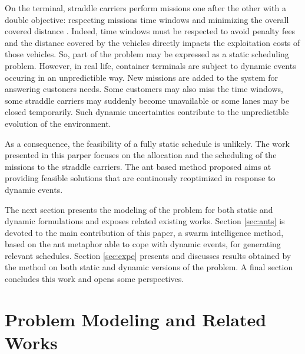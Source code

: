 \documentclass[a4paper,10pt]{article}
\begin{document}
On the terminal, straddle carriers perform missions one after the other with a double objective: respecting missions time windows and minimizing the overall covered distance \cite{Lesauvage2009}. Indeed, time windows must be respected to avoid penalty fees and the distance covered by the vehicles directly impacts the exploitation costs of those vehicles. %
So, part of the problem may be expressed as a static scheduling problem.
However, in real life, container terminals are subject to dynamic events occuring in an unpredictible way. New missions are added to the system for answering custoners needs. Some customers may also miss the time windows, some straddle carriers may suddenly become unavailable or some lanes may be closed temporarily.
Such dynamic uncertainties contribute to the unpredictible evolution of the environment.

As a consequence, the feasibility of a fully static schedule is unlikely. The work presented in this parper focuses on the allocation and the scheduling of the missions to the straddle carriers. The ant based method proposed aims at providing feasible solutions that are continously reoptimized in response to dynamic events.

The next section presents the modeling of the problem for both static and dynamic formulations and exposes related existing works. Section \ref{sec:ants} is devoted to the main contribution of this paper, a swarm intelligence method, based on the ant metaphor able to cope with dynamic events, for generating relevant schedules. Section \ref{sec:expe} presents and discusses results obtained by the method on both static and dynamic versions of the problem. A final section concludes this work and opens some perspectives.


\section{Problem Modeling and Related Works}
\end{document}
